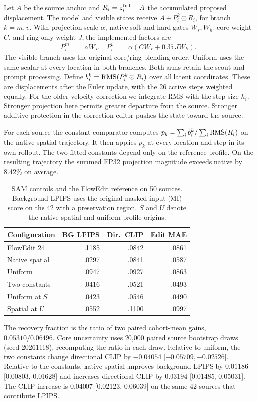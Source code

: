 Let $A$ be the source anchor and $R_i=z_i^{\rm full}-A$ the accumulated proposed displacement. The model and visible states receive $A+P_i^k\odot R_i$, for branch $k=m,v$. With projection scale $\alpha$, native soft and hard gates $W_s,W_h$, core weight $C$, and ring-only weight $J$, the implemented factors are
\begin{align}
P_i^m &= \alpha W_s, &
P_i^v &= \alpha(CW_s+0.35\,J W_h).
\end{align}
The visible branch uses the original core/ring blending order. Uniform uses the same scalar at every location in both branches. Both arms retain the scout and prompt processing. Define $b_i^k=\operatorname{RMS}(P_i^k\odot R_i)$ over all latent coordinates. These are displacements after the Euler update, with the 26 active steps weighted equally. For the older velocity correction we integrate RMS with the step size $h_i$. Stronger projection here permits greater departure from the source. Stronger additive protection in the correction editor pushes the state toward the source.

For each source the constant comparator computes $p_k=\sum_i b_i^k/\sum_i\operatorname{RMS}(R_i)$ on the native spatial trajectory. It then applies $p_k$ at every location and step in its own rollout. The two fitted constants depend only on the reference profile. On the resulting trajectory the summed FP32 projection magnitude exceeds native by 8.42\% on average.

\begin{table}[!t]
\centering\footnotesize
\caption{SAM controls and the FlowEdit reference on 50 sources. Background LPIPS uses the original masked-input (MI) score on the 42 with a preservation region. $S$ and $U$ denote the native spatial and uniform profile origins.}
\label{tab:sam-core}
\begin{tabular}{@{}lrrr@{}}\toprule
Configuration & BG LPIPS & Dir.\ CLIP & Edit MAE\\\midrule
FlowEdit 24 & .1185 & .0842 & .0861\\
Native spatial & .0297 & .0841 & .0587\\
Uniform & .0947 & .0927 & .0863\\
Two constants & .0416 & .0521 & .0493\\
Uniform at $S$ & .0423 & .0546 & .0490\\
Spatial at $U$ & .0552 & .1100 & .0997\\\bottomrule
\end{tabular}
\end{table}
The recovery fraction is the ratio of two paired cohort-mean gains, $0.05310/0.06496$. Core uncertainty uses 20,000 paired source bootstrap draws (seed 20261118), recomputing the ratio in each draw. Relative to uniform, the two constants change directional CLIP by $-0.04054$ [$-0.05709,-0.02526$]. Relative to the constants, native spatial improves background LPIPS by $0.01186$ [0.00803, 0.01628] and increases directional CLIP by $0.03194$ [0.01485, 0.05031]. The CLIP increase is $0.04007$ [0.02123, 0.06039] on the same 42 sources that contribute LPIPS.

